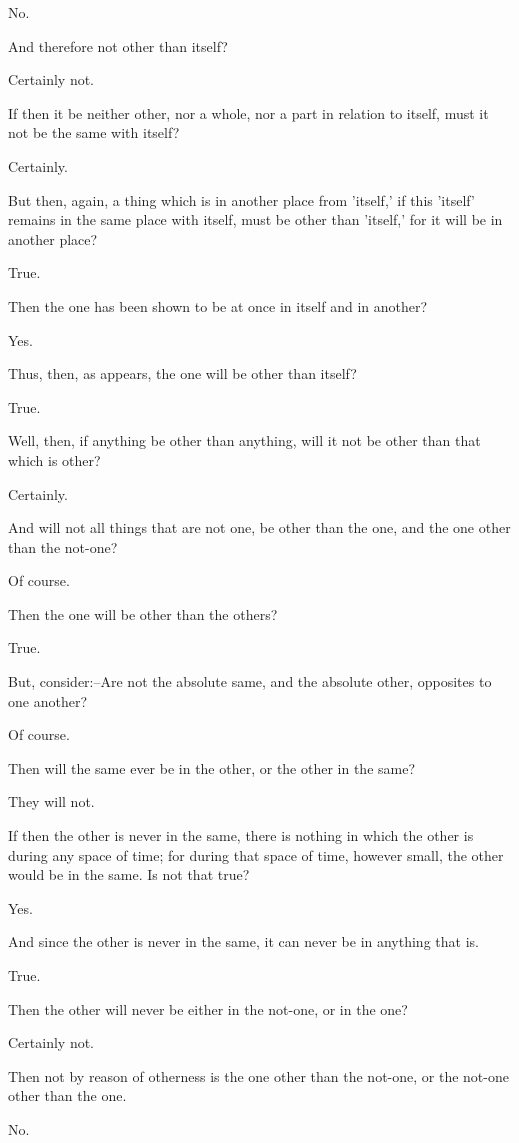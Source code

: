 No.

And therefore not other than itself?

Certainly not.

If then it be neither other, nor a whole, nor a part in relation to
itself, must it not be the same with itself?

Certainly.

But then, again, a thing which is in another place from 'itself,' if
this 'itself' remains in the same place with itself, must be other than
'itself,' for it will be in another place?

True.

Then the one has been shown to be at once in itself and in another?

Yes.

Thus, then, as appears, the one will be other than itself?

True.

Well, then, if anything be other than anything, will it not be other
than that which is other?

Certainly.

And will not all things that are not one, be other than the one, and the
one other than the not-one?

Of course.

Then the one will be other than the others?

True.

But, consider:--Are not the absolute same, and the absolute other,
opposites to one another?

Of course.

Then will the same ever be in the other, or the other in the same?

They will not.

If then the other is never in the same, there is nothing in which
the other is during any space of time; for during that space of time,
however small, the other would be in the same. Is not that true?

Yes.

And since the other is never in the same, it can never be in anything
that is.

True.

Then the other will never be either in the not-one, or in the one?

Certainly not.

Then not by reason of otherness is the one other than the not-one, or
the not-one other than the one.

No.

